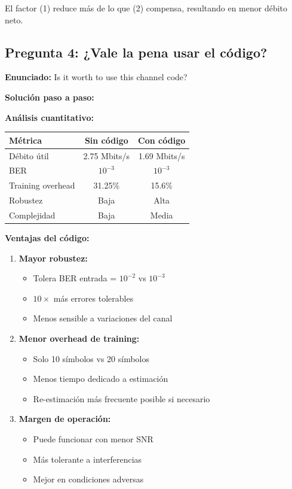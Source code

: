 \documentclass[11pt,a4paper]{article}
\begin{document}
El factor (1) reduce m\'as de lo que (2) compensa, resultando en menor d\'ebito neto.



\subsection*{Pregunta 4: ¿Vale la pena usar el c\'odigo?}

\textbf{Enunciado:} Is it worth to use this channel code?

\vspace{0.3cm}
\textbf{Soluci\'on paso a paso:}

\textbf{An\'alisis cuantitativo:}

\begin{center}
\begin{tabular}{|l|c|c|}
\hline
\textbf{M\'etrica} & \textbf{Sin c\'odigo} & \textbf{Con c\'odigo} \\
\hline
D\'ebito \'util & 2.75 Mbits/s & 1.69 Mbits/s \\
BER & $10^{-3}$ & $10^{-3}$ \\
Training overhead & 31.25\% & 15.6\% \\
Robustez & Baja & Alta \\
Complejidad & Baja & Media \\
\hline
\end{tabular}
\end{center}

\textbf{Ventajas del c\'odigo:}

\begin{enumerate}
    \item \textbf{Mayor robustez:}
    \begin{itemize}
        \item Tolera BER entrada = $10^{-2}$ vs $10^{-3}$
        \item $10\times$ m\'as errores tolerables
        \item Menos sensible a variaciones del canal
    \end{itemize}
    
    \item \textbf{Menor overhead de training:}
    \begin{itemize}
        \item Solo 10 s\'imbolos vs 20 s\'imbolos
        \item Menos tiempo dedicado a estimaci\'on
        \item Re-estimaci\'on m\'as frecuente posible si necesario
    \end{itemize}
    
    \item \textbf{Margen de operaci\'on:}
    \begin{itemize}
        \item Puede funcionar con menor SNR
        \item M\'as tolerante a interferencias
        \item Mejor en condiciones adversas
    \end{itemize}
\end{enumerate}
\end{document}
